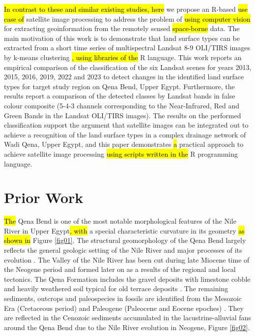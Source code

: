 \documentclass[information,article,submit,pdftex,moreauthors]{Definitions/mdpi}
\begin{document}
\hl{In contrast to these and similar existing studies, here }we propose an R-based \hl{use case of }satellite image processing to address the problem of \hl{using computer vision } for extracting geoinformation from the remotely sensed \hl{space-borne }data. The main motivation of this work is to demonstrate that land surface types can be extracted from a short time series of multispectral Landsat 8-9 OLI/TIRS images by k-means clustering \hl{, using libraries of the }R language. This work reports an empirical comparison of the classification of the six Landsat scenes for years 2013, 2015, 2016, 2019, 2022 and 2023 to detect changes in the identified land surface types for target study region on Qena Bend, Upper Egypt. Furthermore, the results report a comparison of the detected classes by Landsat bands in false colour composite (5-4-3 channels corresponding to the Near-Infrared, Red and Green Bands in the Landsat OLI/TIRS images). The results on the performed classification support the argument that satellite images can be integrated out to achieve a recognition of the land surface types in a complex drainage network of Wadi Qena, Upper Egypt, and this paper demonstrates \hl{a }practical approach to achieve satellite image processing \hl{using scripts written in the }R programming language.

\section{Prior Work}

\hl{The }Qena Bend is one of the most notable morphological features of the Nile River in Upper Egypt\hl{, with }a special characteristic curvature in its geometry \hl{as shown in }Figure \ref{fig01}. The structural geomorphology of the Qena Bend largely reflects the general geologic setting of the Nile River and major processes of its evolution \cite{Said1981,said2017geology}. The Valley of the Nile River has been cut during late Miocene time of the Neogene period and formed later on as a results of the regional and local tectonics. The Qena Formation includes the gravel deposits with limestone cobble and heavily weathered soil typical for old terrace deposits \cite{paulissen1987egyptian}. The remaining sediments, outcrops and paleospecies in fossils are identified from the Mesozoic Era (Cretaceous period) \cite{ABDELHAMID2014138,SOLIMAN1986111} and Paleogene (Paleocene and Eocene epoches) \cite{MANDUR2022104594,sehim1993cretaceous}. They are reflected in the Cenozoic sediments accumulated in the lacustrine-alluvial fans around the Qena Bend due to the Nile River evolution in Neogene, Figure \ref{fig02}.
\end{document}
